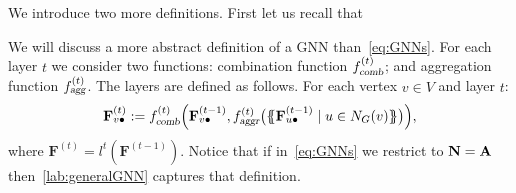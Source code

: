 We introduce two more definitions. First let us recall that 



We will discuss a more abstract definition of a GNN than~\eqref{eq:GNNs}.
For each layer $t$ we consider two functions:
combination function $f_{\textsl{comb}}^{(t)}$; and aggregation function
$f_{\textsl{agg}}^{(t)}$. The layers are defined as follows. For each vertex $v\in V$ and layer $t$:
\begin{equation}
\mathbf{F}^{(t)}_{v\bullet}:=
f_{\textsl{comb}}^{(t)}\Bigl(
\mathbf{F}_{v\bullet}^{(t-1)},f_{\textsl{aggr}}^{(t)}\bigl(\{\!\!\{ \mathbf{F}^{(t-1)}_{u\bullet} \mathrel{\mid} u \in N_G(v) \}\!\!\}\bigr)
\Bigr), \label{lab:generalGNN}
\end{equation}
where $\mathbf{F}^{(t)} = l^{t}(\mathbf{F}^{(t-1)})$. Notice that if in~\eqref{eq:GNNs} we restrict to $\mathbf{N} = \mathbf{A}$ then~\eqref{lab:generalGNN} captures that definition.



